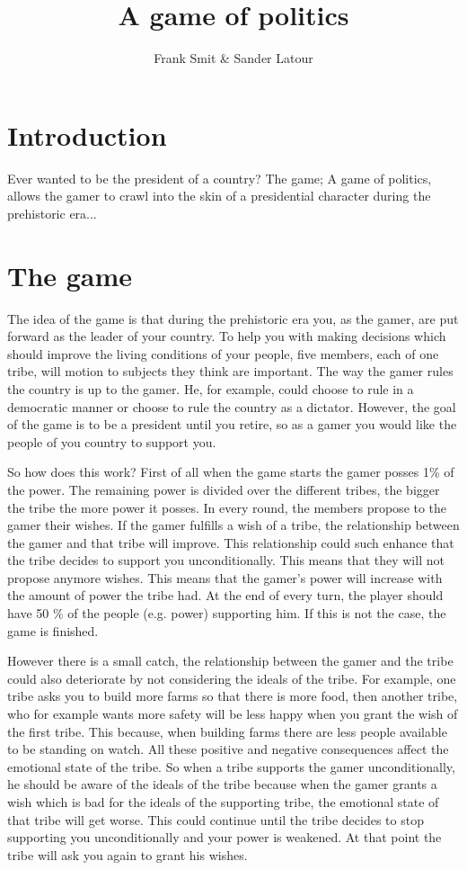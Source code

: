 \documentclass[11pt,a4paper]{article}
\author{Frank Smit \& Sander Latour}
\title{A game of politics}
\begin{document}
\maketitle

\begin{abstract}

\end{abstract}

\section{Introduction}
Ever wanted to be the president of a country? The game; A game of politics, allows the gamer to crawl into the skin of a presidential character during the prehistoric era...

\section{The game}
The idea of the game is that during the prehistoric era you, as the gamer, are put forward as the leader of your country. To help you with making decisions which should improve the living conditions of your people, five members, each of one tribe, will motion to subjects they think are important. The way the gamer rules the country is up to the gamer. He, for example, could choose to rule in a democratic manner or choose to rule the country as a dictator. However, the goal of the game is to be a president until you retire, so as a gamer you would like the people of you country to support you.

So how does this work? First of all when the game starts the gamer posses 1\% of the power. The remaining power is divided over the different tribes, the bigger the tribe the more power it posses. In every round, the members propose to the gamer their wishes. If the gamer fulfills a wish of a tribe, the relationship between the gamer and that tribe will improve. This relationship could such enhance that the tribe decides to support you unconditionally. This means that they will not propose anymore wishes. This means that the gamer's power will increase with the amount of power the tribe had. At the end of every turn, the player should have 50 \% of the people (e.g. power) supporting him. If this is not the case, the game is finished. 

However there is a small catch, the relationship between the gamer and the tribe could also deteriorate by not considering the ideals of the tribe. For example, one tribe asks you to build more farms so that there is more food, then another tribe, who for example wants more safety will be less happy when you grant the wish of the first tribe. This because, when building farms there are less people available to be standing on watch. All these positive and negative consequences affect the emotional state of the tribe. So when a tribe supports the gamer unconditionally, he should be aware of the ideals of the tribe because when the gamer grants a wish which is bad for the ideals of the supporting tribe, the emotional state of that tribe will get worse. This could continue until the tribe decides to stop supporting you unconditionally and your power is weakened. At that point the tribe will ask you again to grant his wishes.
\end{document}
